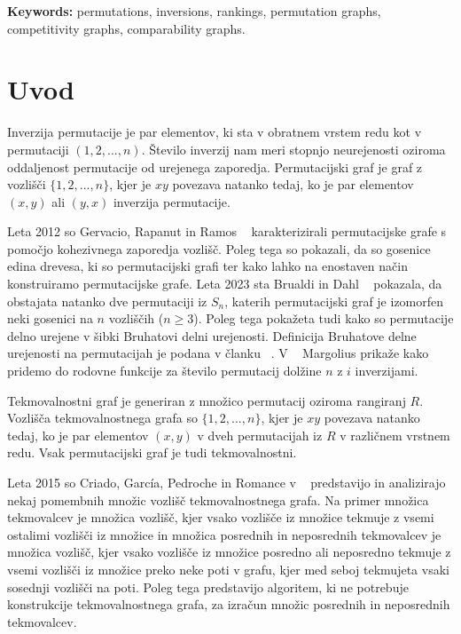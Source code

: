 \documentclass[a4paper, 12pt]{book}
\newcommand{\tkeywordsEn}{permutations, inversions, rankings, permutation graphs, competitivity graphs, comparability graphs}
\newcommand{\clearemptydoublepage}{\newpage{\pagestyle{empty}\cleardoublepage}}
\begin{document}
\noindent\textbf{Keywords:} \tkeywordsEn.
\clearemptydoublepage

\mainmatter
\setcounter{page}{1}
\pagestyle{fancy}

\chapter {Uvod}

Inverzija permutacije je par elementov, ki sta v obratnem vrstem redu kot v permutaciji $(1, 2,..., n)$. Število inverzij nam meri stopnjo neurejenosti oziroma oddaljenost permutacije od urejenega zaporedja. Permutacijski graf je graf z vozlišči $\{ 1, 2, ..., n \}$, kjer je $xy$ povezava natanko tedaj, ko je par elementov $(x, y)$ ali $(y, x)$ inverzija permutacije. 

Leta 2012 so Gervacio, Rapanut in Ramos ~\cite{charectarizationPermutationGraphs} karakterizirali permutacijske grafe s pomočjo kohezivnega zaporedja vozlišč. Poleg tega so pokazali, da so gosenice edina drevesa, ki so permutacijski grafi ter kako lahko na enostaven način konstruiramo permutacijske grafe. Leta 2023 sta Brualdi in Dahl ~\cite{weakBruhatOrder} pokazala, da obstajata natanko dve permutaciji iz $S_n$, katerih permutacijski graf je izomorfen neki gosenici na $n$ vozliščih ($n \geq 3$). Poleg tega pokažeta tudi kako so permutacije delno urejene v šibki Bruhatovi delni urejenosti. Definicija Bruhatove delne urejenosti na permutacijah je podana v članku ~\cite{bruhatOrder}. V ~\cite{generatingFunction} Margolius prikaže kako pridemo do rodovne funkcije za število permutacij dolžine $n$ z $i$ inverzijami.

Tekmovalnostni graf je generiran z množico permutacij oziroma rangiranj $R$. Vozlišča tekmovalnostnega grafa so $\{ 1, 2, ..., n \}$, kjer je $xy$ povezava natanko tedaj, ko je par elementov $(x, y)$ v dveh permutacijah iz $R$ v različnem vrstnem redu. Vsak permutacijski graf je tudi tekmovalnostni.

Leta 2015 so Criado, García, Pedroche in Romance v ~\cite{setsOfRankings} predstavijo in analizirajo nekaj pomembnih množic vozlišč tekmovalnostnega grafa. Na primer množica tekmovalcev je množica vozlišč, kjer vsako vozlišče iz množice tekmuje z vsemi ostalimi vozlišči iz množice in množica posrednih in neposrednih tekmovalcev je množica vozlišč, kjer vsako vozlišče iz množice posredno ali neposredno tekmuje z vsemi vozlišči iz množice preko neke poti v grafu, kjer med seboj tekmujeta vsaki sosednji vozlišči na poti. Poleg tega predstavijo algoritem, ki ne potrebuje konstrukcije tekmovalnostnega grafa, za izračun množic posrednih in neposrednih tekmovalcev.
\end{document}
